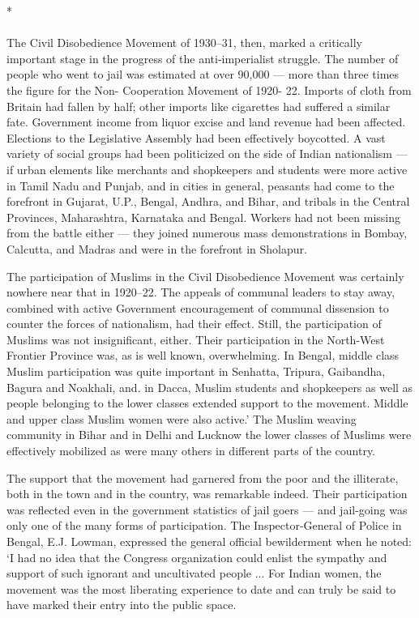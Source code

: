 \begin{multicols}{2}
\begin{center}*\end{center}

\paragraph*{}

The Civil Disobedience Movement of 1930--31, then, marked a critically important stage in the progress of the anti-imperialist struggle. The number of people who went to jail was estimated at over 90,000 --- more than three times the figure for the Non- Cooperation Movement of 1920- 22. Imports of cloth from Britain had fallen by half; other imports like cigarettes had suffered a similar fate. Government income from liquor excise and land revenue had been affected. Elections to the Legislative Assembly had been effectively boycotted. A vast variety of social groups had been politicized on the side of Indian nationalism --- if urban elements like merchants and shopkeepers and students were more active in Tamil Nadu and Punjab, and in cities in general, peasants had come to the forefront in Gujarat, U.P., Bengal, Andhra, and Bihar, and tribals in the Central Provinces, Maharashtra, Karnataka and Bengal. Workers had not been missing from the battle either --- they joined numerous mass demonstrations in Bombay, Calcutta, and Madras and were in the forefront in Sholapur.

The participation of Muslims in the Civil Disobedience Movement was certainly nowhere near that in 1920--22. The appeals of communal leaders to stay away, combined with active Government encouragement of communal dissension to counter the forces of nationalism, had their effect. Still, the participation of Muslims was not insignificant, either. Their participation in the North-West Frontier Province was, as is well known, overwhelming. In Bengal, middle class Muslim participation was quite important in Senhatta, Tripura, Gaibandha, Bagura and Noakhali, and. in Dacca, Muslim students and shopkeepers as well as people belonging to the lower classes extended support to the movement. Middle and upper class Muslim women were also active.' The Muslim weaving community in Bihar and in Delhi and Lucknow the lower classes of Muslims were effectively mobilized as were many others in different parts of the country.

The support that the movement had garnered from the poor and the illiterate, both in the town and in the country, was remarkable indeed. Their participation was reflected even in the government statistics of jail goers --- and jail-going was only one of the many forms of participation. The Inspector-General of Police in Bengal, E.J. Lowman, expressed the general official bewilderment when he noted: `I had no idea that the Congress organization could enlist the sympathy and support of such ignorant and uncultivated people ... For Indian women, the movement was the most liberating experience to date and can truly be said to have marked their entry into the public space.
\end{multicols}